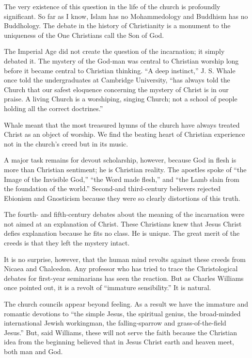 The very existence of this question in the life of the church is profoundly significant. So far as I
know, Islam has no Mohammedology and Buddhism has no Buddhology. The debate in the history of
Christianity is a monument to the uniqueness of the One Christians call the Son of God.

The Imperial Age did not create the question of the incarnation; it simply debated it. The mystery
of the God-man was central to Christian worship long before it became central to Christian thinking.
“A deep instinct,” J. S. Whale once told the undergraduates at Cambridge University, “has always
told the Church that our safest eloquence concerning the mystery of Christ is in our praise. A
living Church is a worshiping, singing Church; not a school of people holding all the correct
doctrines.”

Whale meant that the most treasured hymns of the church have always treated Christ as an object of
worship. We find the beating heart of Christian experience not in the church’s creed but in its
music.

A major task remains for devout scholarship, however, because God in flesh is more than Christian
sentiment; he is Christian reality. The apostles spoke of “the Image of the Invisible God,” “the
Word made flesh,” and “the Lamb slain from the foundation of the world.” Second-and third-century
believers rejected Ebionism and Gnosticism because they were so clearly distortions of this truth.

The fourth- and fifth-century debates about the meaning of the incarnation were not aimed at an
explanation of Christ. These Christians knew that Jesus Christ defies explanation because he fits no
class. He is unique. The great merit of the creeds is that they left the mystery intact.

It is no surprise, however, that the human mind revolts against these creeds from Nicaea and
Chalcedon. Any professor who has tried to trace the Christological debates for first-year
seminarians has seen the reaction. But as Charles Williams once pointed out, it is a revolt of
“immature sensibility.” It is natural.

The church councils appear beyond feeling. As a result we have the immature and romantic devotions
to “the simple Jesus, the spiritual genius, the broad-minded international Jewish workingman, the
falling-sparrow and grass-of-the-field Jesus.” But, said Williams, these will not serve the faith
because the Christian idea from the beginning believed that in Jesus Christ earth and heaven meet,
both man and God.

